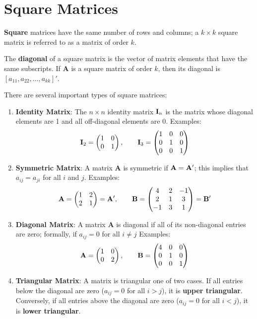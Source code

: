 \documentclass[]{book}
\theoremstyle{definition}
\theoremstyle{definition}
\theoremstyle{definition}
\theoremstyle{remark}
\begin{document}
\section{Square Matrices}\label{square-matrices}

\textbf{Square} matrices have the same number of rows and columns; a
\(k \times k\) square matrix is referred to as a matrix of order \(k\).

The \textbf{diagonal} of a square matrix is the vector of matrix
elements that have the same subscripts. If \textbf{A} is a square matrix
of order \(k\), then its diagonal is
\([ a_{11}, a_{22}, \dots, a_{kk}]'\).

There are several important types of square matrices:

\begin{enumerate}
\def\labelenumi{\arabic{enumi}.}
\item
  \textbf{Identity Matrix}: The \(n\times n\) identity matrix
  \({\bf I}_n\) is the matrix whose diagonal elements are 1 and all
  off-diagonal elements are 0. Examples:
  \[ {\bf I}_2=\begin{pmatrix} 1&0\\0&1 \end{pmatrix}, \qquad {\bf I}_3=\begin{pmatrix} 1&0&0\\ 0&1&0\\ 
          0&0&1 \end{pmatrix}\]
\item
  \textbf{Symmetric Matrix}: A matrix \textbf{A} is symmetric if
  \({\bf A} = {\bf A}'\); this implies that \(a_{ij} = a_{ji}\) for all
  \(i\) and \(j\). Examples:
  \[ {\bf A} = \begin{pmatrix} 1&2\\2&1 \end{pmatrix} = {\bf A}', \qquad {\bf B} =\begin{pmatrix} 4&2&-1\\ 2&1&3\\
          -1&3&1 \end{pmatrix} = {\bf B}'\]
\item
  \textbf{Diagonal Matrix}: A matrix \textbf{A} is diagonal if all of
  its non-diagonal entries are zero; formally, if \(a_{ij} = 0\) for all
  \(i \neq j\) Examples:
  \[ {\bf A} = \begin{pmatrix} 1&0\\0&2 \end{pmatrix}, \qquad {\bf B} =\begin{pmatrix} 4&0&0\\ 0&1&0\\
          0&0&1 \end{pmatrix}\]
\item
  \textbf{Triangular Matrix}: A matrix is triangular one of two cases.
  If all entries below the diagonal are zero (\(a_{ij} = 0\) for all
  \(i > j\)), it is \textbf{upper triangular}. Conversely, if all
  entries above the diagonal are zero (\(a_{ij} = 0\) for all
  \(i < j\)), it is \textbf{lower triangular}.
\end{enumerate}
\end{document}
